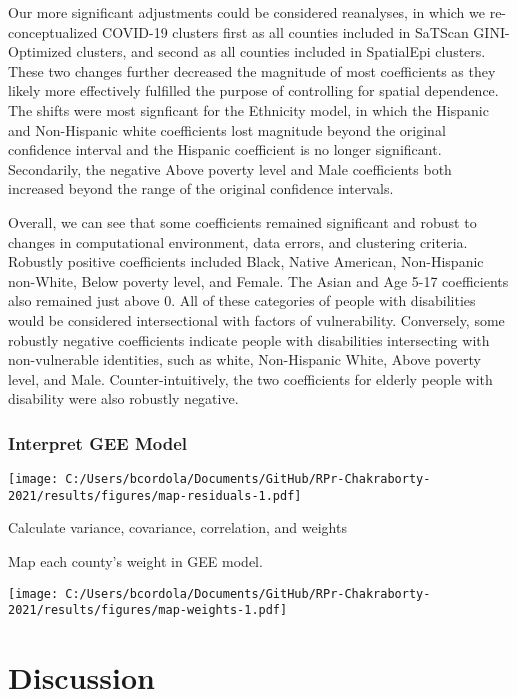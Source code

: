 \documentclass[
]{article}
\begin{document}
Our more significant adjustments could be considered reanalyses, in
which we re-conceptualized COVID-19 clusters first as all counties
included in SaTScan GINI-Optimized clusters, and second as all counties
included in SpatialEpi clusters. These two changes further decreased the
magnitude of most coefficients as they likely more effectively fulfilled
the purpose of controlling for spatial dependence. The shifts were most
signficant for the Ethnicity model, in which the Hispanic and
Non-Hispanic white coefficients lost magnitude beyond the original
confidence interval and the Hispanic coefficient is no longer
significant. Secondarily, the negative Above poverty level and Male
coefficients both increased beyond the range of the original confidence
intervals.

Overall, we can see that some coefficients remained significant and
robust to changes in computational environment, data errors, and
clustering criteria. Robustly positive coefficients included Black,
Native American, Non-Hispanic non-White, Below poverty level, and
Female. The Asian and Age 5-17 coefficients also remained just above 0.
All of these categories of people with disabilities would be considered
intersectional with factors of vulnerability. Conversely, some robustly
negative coefficients indicate people with disabilities intersecting
with non-vulnerable identities, such as white, Non-Hispanic White, Above
poverty level, and Male. Counter-intuitively, the two coefficients for
elderly people with disability were also robustly negative.

\hypertarget{interpret-gee-model}{%
\subsubsection{Interpret GEE Model}\label{interpret-gee-model}}

\texttt{[image: C:/Users/bcordola/Documents/GitHub/RPr-Chakraborty-2021/results/figures/map-residuals-1.pdf]}

Calculate variance, covariance, correlation, and weights

Map each county's weight in GEE model.

\texttt{[image: C:/Users/bcordola/Documents/GitHub/RPr-Chakraborty-2021/results/figures/map-weights-1.pdf]}

\hypertarget{discussion}{%
\section{Discussion}\label{discussion}}
\end{document}
